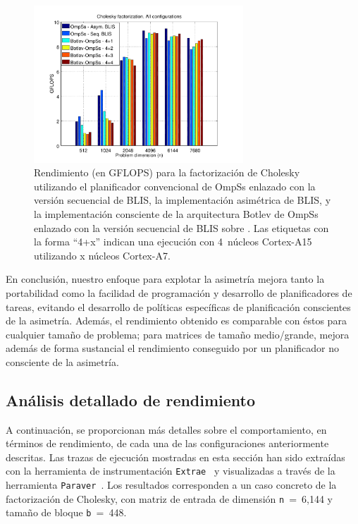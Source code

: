 \begin{figure}
\centering
\includegraphics[width=0.70\textwidth]{Plots/Comparative/comparative}
\caption{Rendimiento (en GFLOPS) para la factorización de Cholesky utilizando 
el planificador convencional de OmpSs enlazado con la versión secuencial de BLIS, la implementación asimétrica de BLIS, y 
la implementación consciente de la arquitectura Botlev de OmpSs enlazado con la versión secuencial de BLIS sobre \odroid. 
Las etiquetas con la forma ``4+x'' indican una ejecución con 4~núcleos Cortex-A15 utilizando x núcleos Cortex-A7.}
\label{fig:comparative}
\end{figure}

En conclusión, nuestro enfoque para explotar la asimetría mejora tanto la portabilidad como la facilidad de
programación y desarrollo de planificadores de tareas, evitando el desarrollo de políticas específicas de planificación
conscientes de la asimetría. Además, el rendimiento obtenido es comparable con éstos para cualquier tamaño de problema; para
matrices de tamaño medio/grande, mejora además de forma sustancial el rendimiento conseguido por un planificador no consciente de la
asimetría.

\subsection{Análisis detallado de rendimiento}

A continuación, se proporcionan más detalles sobre el comportamiento, en términos de rendimiento, de cada una de las 
configuraciones anteriormente descritas. Las trazas de ejecución mostradas en esta sección han sido extraídas con la
herramienta de instrumentación {\tt Extrae}~\cite{Extrae} y visualizadas a través de la herramienta {\tt Paraver}~\cite{Paraver}.
Los resultados corresponden a un caso concreto de la factorización de Cholesky, con matriz de entrada de dimensión
{\tt n}~=~6,144 y tamaño de bloque {\tt b}~=~448.

